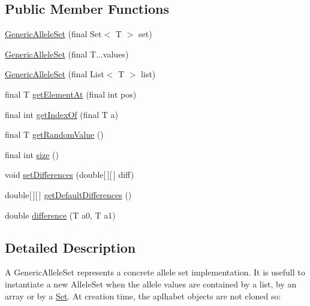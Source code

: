 \subsection*{Public Member Functions}
\begin{DoxyCompactItemize}
\item 
\hyperlink{classjenes_1_1chromosome_1_1_generic_allele_set_3_01_t_01_4_afc6f6f35af245d54ba7ad6f57a9a3893}{Generic\-Allele\-Set} (final Set$<$ T $>$ set)
\item 
\hyperlink{classjenes_1_1chromosome_1_1_generic_allele_set_3_01_t_01_4_ae7a1970427bae039c3f4ae6340b53ca7}{Generic\-Allele\-Set} (final T...\-values)
\item 
\hyperlink{classjenes_1_1chromosome_1_1_generic_allele_set_3_01_t_01_4_a8cbf2394287ce6321fcd338dc4c44a8e}{Generic\-Allele\-Set} (final List$<$ T $>$ list)
\item 
final T \hyperlink{classjenes_1_1chromosome_1_1_generic_allele_set_3_01_t_01_4_acf8f796e2243cc0b745b8d21e45ac7df}{get\-Element\-At} (final int pos)
\item 
final int \hyperlink{classjenes_1_1chromosome_1_1_generic_allele_set_3_01_t_01_4_a9b5dd0079f5d0cb76d2f89e92bde3fa6}{get\-Index\-Of} (final T a)
\item 
final T \hyperlink{classjenes_1_1chromosome_1_1_generic_allele_set_3_01_t_01_4_a2f330d71d992e0d724bc31730b56229e}{get\-Random\-Value} ()
\item 
final int \hyperlink{classjenes_1_1chromosome_1_1_generic_allele_set_3_01_t_01_4_a568ca617716496507d41e348c5bc2845}{size} ()
\item 
void \hyperlink{classjenes_1_1chromosome_1_1_generic_allele_set_3_01_t_01_4_a234b0a286a14fcaf0bf10894813465c5}{set\-Differences} (double\mbox{[}$\,$\mbox{]}\mbox{[}$\,$\mbox{]} diff)
\item 
double\mbox{[}$\,$\mbox{]}\mbox{[}$\,$\mbox{]} \hyperlink{classjenes_1_1chromosome_1_1_generic_allele_set_3_01_t_01_4_a9c24972536c41a2d4660d9cad2694eba}{get\-Default\-Differences} ()
\item 
double \hyperlink{classjenes_1_1chromosome_1_1_generic_allele_set_3_01_t_01_4_ace70b10ee535ccc3a7cbcd42739b8d5c}{difference} (T a0, T a1)
\end{DoxyCompactItemize}


\subsection{Detailed Description}
A Generic\-Allele\-Set represents a concrete allele set implementation. It is usefull to instantiate a new Allele\-Set when the allele values are contained by a list, by an array or by a \hyperlink{}{Set}. At creation time, the aplhabet objects are not cloned so\-: 


